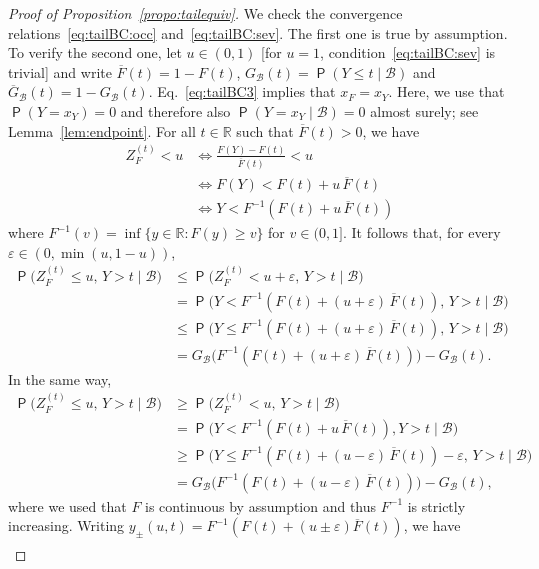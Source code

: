 \documentclass[12pt]{article}
\newcommand{\Q}{\operatorname{\mathsf{P}}}
\newcommand{\R}{\mathbb{R}}
\newcommand{\Bb}{\mathcal{B}}
\newcommand{\1}{\mathbf{1}} %
\newcommand{\eps}{\varepsilon}
\newcommand{\Fbar}{\overline{F}}
\newcommand{\GB}{G_{\Bb}}
\newcommand{\GBbar}{\overline{G}_{\Bb}}
\newcommand{\ZFt}{Z_{F}^{(t)}} %
\theoremstyle{definition}
\begin{document}
\begin{proof}[Proof of Proposition~\ref{propo:tailequiv}]
	We check the convergence relations~\eqref{eq:tailBC:occ} and~\eqref{eq:tailBC:sev}. The first one is true by assumption. To verify the second one, let $u \in (0, 1)$ [for $u = 1$, condition~\eqref{eq:tailBC:sev} is trivial] and write $\Fbar(t) = 1-F(t)$, $\GB(t) = \Q(Y \le t \mid \Bb)$ and $\GBbar(t) = 1 - \GB(t)$. Eq.~\eqref{eq:tailBC3} implies that $x_F = x_Y$.
	Here, we use that $\Q(Y = x_Y) = 0$ and therefore also $\Q(Y = x_Y \mid \Bb) = 0$ almost surely; see Lemma~\ref{lem:endpoint}.
	For all $t \in \R$ such that $\Fbar(t) > 0$, we have
	\begin{align*}
		\ZFt < u
		&\iff \frac{F(Y) - F(t)}{\Fbar(t)} < u \\
		&\iff F(Y) < F(t) + u \, \Fbar(t) \\
		&\iff Y < F^{-1} \left( F(t) + u \, \Fbar(t) \right)
	\end{align*}
	where $F^{-1}(v) = \inf \{ y \in \R : F(y) \ge v \}$ for $v \in (0, 1]$. It follows that, for every $\eps \in (0, \min(u,1-u))$,
	\begin{align*}
		\Q \bigl( \ZFt \le u, \, Y > t \mid \Bb \bigr)
		&\le \Q \bigl( \ZFt < u+\eps, \, Y > t \mid \Bb \bigr) \\
		&= \Q \bigl( Y < F^{-1} \left( F(t) + (u+\eps) \, \Fbar(t) \right), \, Y > t \mid \Bb \bigr) \\
		&\le \Q \bigl( Y \le F^{-1} \left( F(t) + (u+\eps) \, \Fbar(t) \right), \, Y > t \mid \Bb \bigr) \\
		&= \GB \bigl( F^{-1} \left( F(t) + (u+\eps) \, \Fbar(t) \right) \bigr) - \GB(t).
	\end{align*}
	In the same way,
	\begin{align*}
		\Q \bigl( \ZFt \le u, \, Y > t \mid \Bb \bigr)
		&\ge \Q \bigl( \ZFt < u, \, Y > t \mid \Bb \bigr) \\
		&= \Q \bigl( Y < F^{-1} \left( F(t) + u \, \Fbar(t) \right), Y > t \mid \Bb \bigr) \\
		&\ge \Q \bigl( Y \le F^{-1} \left( F(t) + (u-\eps) \, \Fbar(t) \right) - \eps, \, Y > t \mid \Bb \bigr) \\
		&= \GB \bigl( F^{-1} \left( F(t) + (u-\eps) \, \Fbar(t) \right) \bigr) - \GB(t),
	\end{align*}
	where we used that $F$ is continuous by assumption and thus $F^{-1}$ is strictly increasing. Writing $y_{\pm}(u,t) = F^{-1}\left(F(t) + (u\pm \eps) \Fbar(t)\right)$, we have
	\begin{align*}

\end{align*}
\end{proof}
\end{document}
